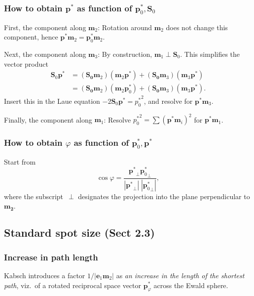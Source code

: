 \documentclass[twocolumn,preprintnumbers,amsmath,amssymb]{revtex4}
\def\v#1{\mathbf{#1}}
\begin{document}
\subsubsection{How to obtain $\v{p}^*$ as function of $\v{p}^*_0,\v{S}_0$}

First, the component along $\v{m}_2$: Rotation around $\v{m}_2$ does not change this component,
hence $\v{p}^*\v{m}_2 = \v{p}^*_0\v{m}_2$.

Next, the component along $\v{m}_3$:
By construction, $\v{m}_1\perp\v{S}_0$.
This simplifies the vector product
\begin{equation}
\begin{array}{ll}
   \v{S}_0\v{p}^*&=(\v{S_0}\v{m}_2)(\v{m}_2\v{p}^*) + (\v{S_0}\v{m}_3)(\v{m}_3\v{p}^*)
\\
                &=(\v{S_0}\v{m}_2)(\v{m}_2\v{p}^*_0) + (\v{S_0}\v{m}_3)(\v{m}_3\v{p}^*).
\end{array}
\end{equation}
Insert this in the Laue equation $-2\v{S}_0\v{p}^*={p^*_0}^2$,
and resolve for $\v{p}^*\v{m}_3$.

Finally, the component along $\v{m}_1$:
Resolve ${p^*_0}^2=\sum {(\v{p}^*\v{m}_i)}^2$ for $\v{p}^*\v{m}_1$.

\subsubsection{How to obtain $\varphi$ as function of $\v{p}^*_0,\v{p}^*$}

Start from
\begin{equation}
  \cos\varphi=\frac{{\v{p}^*}_\perp{\v{p}^*_0}_\perp}{|{\v{p}^*}_\perp|\;|{\v{p}^*_0}_\perp|},
\end{equation}
where the subscript~$\perp$ designates the projection into the plane
perpendicular to $\v{m_2}$.

\subsection{Standard spot size (Sect 2.3)}

\subsubsection{Increase in path length}

Kabsch introduces a factor $1/|\v{e}_1\v{m}_2|$ as
\textit{an increase in the length of the shortest path},
viz.\ of a rotated reciprocal space vector $\v{p}^*_\varphi$ across the Ewald sphere.
\end{document}
